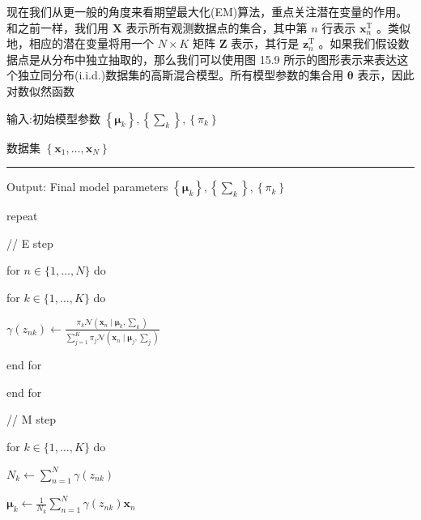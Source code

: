 \documentclass[10pt]{report}
\newcommand{\HRule}{\begin{center}\rule{0.9\linewidth}{0.2mm}\end{center}}
\begin{document}
现在我们从更一般的角度来看期望最大化(EM)算法，重点关注潜在变量的作用。和之前一样，我们用 \(\mathbf{X}\) 表示所有观测数据点的集合，其中第 \(n\) 行表示 \({\mathbf{x}}_{n}^{\mathrm{T}}\) 。类似地，相应的潜在变量将用一个 \(N \times  K\) 矩阵 \(\mathbf{Z}\) 表示，其行是 \({\mathbf{z}}_{n}^{\mathrm{T}}\) 。如果我们假设数据点是从分布中独立抽取的，那么我们可以使用图 15.9 所示的图形表示来表达这个独立同分布(i.i.d.)数据集的高斯混合模型。所有模型参数的集合用 \(\mathbf{\theta }\) 表示，因此对数似然函数

输入:初始模型参数 \(\left\{  {\mathbf{\mu }}_{k}\right\}  ,\left\{  {\mathbf{\sum }}_{k}\right\}  ,\left\{  {\pi }_{k}\right\}\)

数据集 \(\left\{  {{\mathbf{x}}_{1},\ldots ,{\mathbf{x}}_{N}}\right\}\)

\HRule

Output: Final model parameters \(\left\{  {\mathbf{\mu }}_{k}\right\}  ,\left\{  {\mathbf{\sum }}_{k}\right\}  ,\left\{  {\pi }_{k}\right\}\)

repeat

\hspace*{2em} // E step

\hspace*{1em} for \(n \in  \{ 1,\ldots ,N\}\) do

\hspace*{3em} for \(k \in  \{ 1,\ldots ,K\}\) do

\hspace*{4em} \(\gamma \left( {z}_{nk}\right)  \leftarrow  \frac{{\pi }_{k}\mathcal{N}\left( {{\mathbf{x}}_{n} \mid  {\mathbf{\mu }}_{k},{\mathbf{\sum }}_{k}}\right) }{\mathop{\sum }\limits_{{j = 1}}^{K}{\pi }_{j}\mathcal{N}\left( {{\mathbf{x}}_{n} \mid  {\mathbf{\mu }}_{j},{\mathbf{\sum }}_{j}}\right) }\)

\hspace*{3em} end for

\hspace*{1em} end for

\hspace*{1em} // M step

\hspace*{1em} for \(k \in  \{ 1,\ldots ,K\}\) do

\hspace*{3em} \({N}_{k} \leftarrow  \mathop{\sum }\limits_{{n = 1}}^{N}\gamma \left( {z}_{nk}\right)\)

\hspace*{3em} \({\mathbf{\mu }}_{k} \leftarrow  \frac{1}{{N}_{k}}\mathop{\sum }\limits_{{n = 1}}^{N}\gamma \left( {z}_{nk}\right) {\mathbf{x}}_{n}\)
\end{document}
